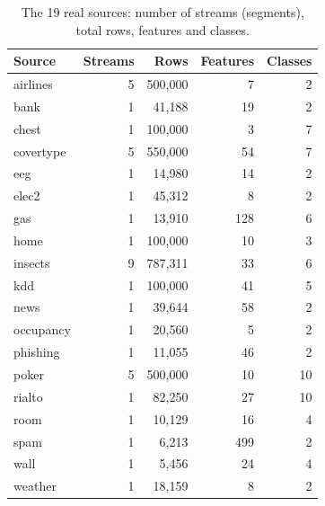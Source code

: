 \begin{table}[h]
\centering
\caption{The 19 real sources: number of streams (segments), total rows, features and classes.}
\label{tab:data}
\small
\begin{tabular}{lrrrr}
\toprule
Source & Streams & Rows & Features & Classes \\
\midrule
airlines & 5 & 500,000 & 7 & 2 \\
bank & 1 & 41,188 & 19 & 2 \\
chest & 1 & 100,000 & 3 & 7 \\
covertype & 5 & 550,000 & 54 & 7 \\
eeg & 1 & 14,980 & 14 & 2 \\
elec2 & 1 & 45,312 & 8 & 2 \\
gas & 1 & 13,910 & 128 & 6 \\
home & 1 & 100,000 & 10 & 3 \\
insects & 9 & 787,311 & 33 & 6 \\
kdd & 1 & 100,000 & 41 & 5 \\
news & 1 & 39,644 & 58 & 2 \\
occupancy & 1 & 20,560 & 5 & 2 \\
phishing & 1 & 11,055 & 46 & 2 \\
poker & 5 & 500,000 & 10 & 10 \\
rialto & 1 & 82,250 & 27 & 10 \\
room & 1 & 10,129 & 16 & 4 \\
spam & 1 & 6,213 & 499 & 2 \\
wall & 1 & 5,456 & 24 & 4 \\
weather & 1 & 18,159 & 8 & 2 \\
\bottomrule
\end{tabular}
\end{table}
